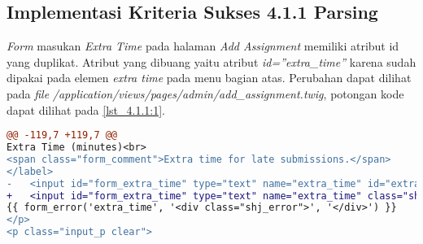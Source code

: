 \subsection{Implementasi Kriteria Sukses 4.1.1 Parsing}
\label{subsec:implementasi_A_4.1.1}

\textit{Form} masukan \textit{Extra Time} pada halaman \textit{Add Assignment} memiliki atribut id yang duplikat. Atribut yang dibuang yaitu atribut \textit{id=''extra\_time''} karena sudah dipakai pada elemen \textit{extra time} pada menu bagian atas. Perubahan dapat dilihat pada \textit{file} \textit{/application/views/pages/admin/add\_assignment.twig}, potongan kode dapat dilihat pada \ref{lst_4.1.1:1}.

\begin{lstlisting}[language=diff, caption=Perubahan pada \textit{file} \textit{add\_assignment.twig}, label=lst_4.1.1:1, basicstyle=\ttfamily, frame=single,
columns=fullflexible, keepspaces=true, breaklines=true]
@@ -119,7 +119,7 @@
Extra Time (minutes)<br>
<span class="form_comment">Extra time for late submissions.</span>
</label>
- 	<input id="form_extra_time" type="text" name="extra_time" id="extra_time" class="sharif_input medium" value="{{ edit ? edit_assignment.extra_time|extra_time_formatter : set_value('extra_time') }}" />
+ 	<input id="form_extra_time" type="text" name="extra_time" class="sharif_input medium" value="{{ edit ? edit_assignment.extra_time|extra_time_formatter : set_value('extra_time') }}" />
{{ form_error('extra_time', '<div class="shj_error">', '</div>') }}
</p>
<p class="input_p clear">
\end{lstlisting}